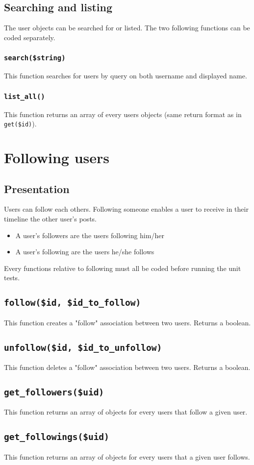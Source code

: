 \documentclass[twoside,a4paper,12pt]{article}
\begin{document}
\subsection{Searching and listing}
The user objects can be searched for or listed. The two following functions can be coded separately.

\subsubsection{\texttt{search(\$string)}}
This function searches for users by query on both username and displayed name.

\subsubsection{\texttt{list\_all()}}
This function returns an array of every users objects (same return format as in \texttt{get(\$id)}).

\section{Following users}

\subsection{Presentation}
Users can follow each others. Following someone enables a user to receive in their timeline the other user's posts.

\begin{itemize}
\item A user's followers are the users following him/her
\item A user's following are the users he/she follows
\end{itemize}

Every functions relative to following must all be coded before running the unit tests. 

\subsection{\texttt{follow(\$id, \$id\_to\_follow)}}
This function creates a "follow" association between two users. Returns a boolean.

\subsection{\texttt{unfollow(\$id, \$id\_to\_unfollow)}}
This function deletes a "follow" association between two users. Returns a boolean.

\subsection{\texttt{get\_followers(\$uid)}}
This function returns an array of objects for every users that follow a given user.

\subsection{\texttt{get\_followings(\$uid)}}
This function returns an array of objects for every users that a given user follows.
\end{document}
